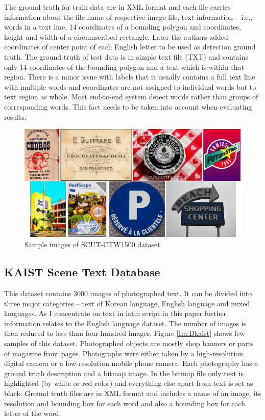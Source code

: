 The ground truth for train data are in XML format and each file carries information about the file name of respective image file, text information -- i.e., words in a text line, 14 coordinates of a bounding polygon and coordinates, height and width of a circumscribed rectangle. Later the authors added coordinates of center point of each English letter to be used as detection ground truth. The ground truth of test data is in simple text file (TXT) and contains only 14 coordinates of the bounding polygon and a text which is within that region. There is a minor issue with labels that it usually contains a full text line with multiple words and coordinates are not assigned to individual words but to text region as whole. Most end-to-end system detect words rather than groups of corresponding words. This fact needs to be taken into account when evaluating results.

\begin{figure}[hbtp]
    \centering
    \includegraphics[scale=0.4]{obrazky/Dataset_ctw.png}
    \caption{Sample images of SCUT-CTW1500 dataset.}
    \label{Im:Dctw}
\end{figure}

\subsection{KAIST Scene Text Database}

This dataset contains 3000 images of photographed text. It can be divided into three major categories -- text of Korean language, English language and mixed languages. As I concentrate on text in latin script in this paper further information relates to the English language dataset. The number of images is then reduced to less than four hundred images. Figure \ref*{Im:Dkaist} shows few samples of this dataset. Photographed objects are mostly shop banners or parts of magazine front pages. Photographs were either taken by a high-resolution digital camera or a low-resolution mobile phone camera.\cite{kaist} Each photography has a ground truth description and a bitmap image. In the bitmap file only text is highlighted (by white or red color) and everything else apart from text is set as black. Ground truth files are in XML format and includes a name of an image, its resolution and bounding box for each word and also a bounding box for each letter of the word.

